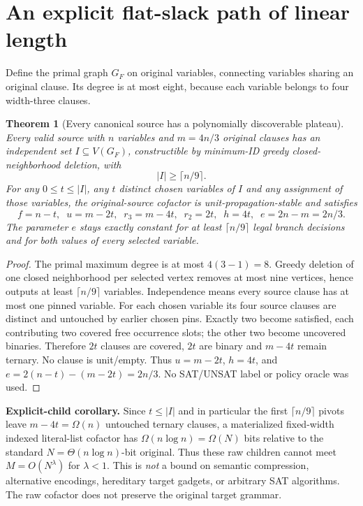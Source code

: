 \documentclass[11pt]{article}
\newtheorem{theorem}{Theorem}
\begin{document}
\section{An explicit flat-slack path of linear length}
Define the primal graph $G_F$ on original variables, connecting variables sharing an original clause. Its degree is at most eight, because each variable belongs to four width-three clauses.
\begin{theorem}[Every canonical source has a polynomially discoverable plateau]\label{thm:plat}
Every valid source with $n$ variables and $m=4n/3$ original clauses has an independent set $I\subseteq V(G_F)$, constructible by minimum-ID greedy closed-neighborhood deletion, with
\[
\boxed{|I|\ge\lceil n/9\rceil.}
\]
For any $0\le t\le |I|$, any $t$ distinct chosen variables of $I$ and any assignment of those variables, the original-source cofactor is unit-propagation-stable and satisfies
\[
\boxed{f=n-t,\;\; u=m-2t,\;\; r_3=m-4t,\;\;
r_2=2t,\;\;h=4t,\;\;e=2n-m=2n/3.}
\]
The parameter $e$ stays exactly constant for at least $\lceil n/9\rceil$ legal branch decisions and for \emph{both} values of every selected variable.
\end{theorem}
\begin{proof}
The primal maximum degree is at most $4(3-1)=8$. Greedy deletion of one closed neighborhood per selected vertex removes at most nine vertices, hence outputs at least $\lceil n/9\rceil$ variables. Independence means every source clause has at most one pinned variable. For each chosen variable its four source clauses are distinct and untouched by earlier chosen pins. Exactly two become satisfied, each contributing two covered free occurrence slots; the other two become uncovered binaries. Therefore $2t$ clauses are covered, $2t$ are binary and $m-4t$ remain ternary. No clause is unit/empty. Thus $u=m-2t$, $h=4t$, and $e=2(n-t)-(m-2t)=2n/3$. No SAT/UNSAT label or policy oracle was used.
\end{proof}
\noindent\textbf{Explicit-child corollary.} Since $t\le |I|$ and in particular the first $\lceil n/9\rceil$ pivots leave $m-4t=\Omega(n)$ untouched ternary clauses, a materialized fixed-width indexed literal-list cofactor has $\Omega(n\log n)=\Omega(N)$ bits relative to the standard $N=\Theta(n\log n)$-bit original. Thus these raw children cannot meet $M=O(N^\lambda)$ for $\lambda<1$. This is \emph{not} a bound on semantic compression, alternative encodings, hereditary target gadgets, or arbitrary SAT algorithms. The raw cofactor does not preserve the original target grammar.
\end{document}
